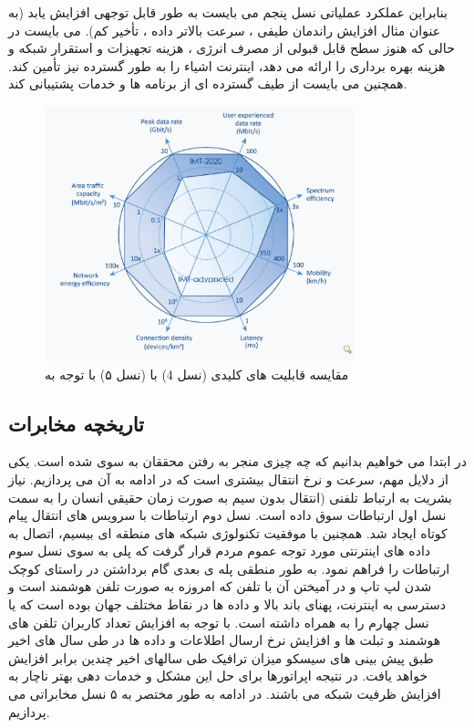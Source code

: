 بنابراین عملکرد عملیاتی نسل پنجم می بایست به طور قابل توجهی افزایش یابد (به عنوان مثال افزایش راندمان طیفی ، سرعت بالاتر داده ، تأخیر کم).
می بایست
در حالی که هنوز سطح قابل قبولی از مصرف انرژی ، هزینه تجهیزات و استقرار شبکه و هزینه بهره برداری را ارائه می دهد،
 اینترنت اشیاء را به طور گسترده نیز تأمین کند.
 همچنین می بایست 
از طیف گسترده ای از برنامه ها و خدمات پشتیبانی کند.
 \begin{figure}[H]
  \centering
    \includegraphics[width=0.8\textwidth]{./fig/etsi}
  \caption{مقایسه قابلیت های کلیدی
 (نسل 4) با
 (نسل ۵) 
 با توجه به
\cite{etsi}
  }
  \label{fig:C-RAN}
\end{figure}
\subsection{تاریخچه مخابرات}
در ابتدا می خواهیم بدانیم که چه چیزی منجر به رفتن محققان به سوی   شده است. یکی از دلایل مهم، سرعت و نرخ انتقال بیشتری است که در ادامه به آن می پردازیم.
نیاز بشریت به ارتباط تلفنی (انتقال بدون سیم به صورت زمان حقیقی  انسان را به سمت نسل اول ارتباطات  سوق داده است. نسل دوم ارتباطات  با سرویس های انتقال پیام کوتاه ایجاد شد. همچنین با موفقیت تکنولوژی شبکه های منطقه ای بیسیم، اتصال به داده های اینترنتی مورد توجه عموم مردم قرار گرفت که پلی به سوی نسل سوم ارتباطات  را فراهم نمود. به طور منطقی پله ی بعدی گام برداشتن در راستای کوچک شدن لپ تاپ و در آمیختن آن با تلفن که امروزه به صورت تلفن هوشمند است و دسترسی به  اینترنت، پهنای باند بالا و داده ها در نقاط مختلف جهان بوده است که  یا نسل چهارم را به همراه داشته است.
با توجه به افزایش تعداد کاربران تلفن های
هوشمند و تبلت ها و افزایش نرخ ارسال اطلاعات و داده ها در طی سال
های اخیر طبق پیش بینی های سیسکو میزان ترافیک  طی سالهای اخیر
  چندین برابر افزایش خواهد یافت.
در نتیجه اپراتورها برای حل این مشکل و خدمات
دهی بهتر ناچار به افزایش ظرفیت شبکه می باشند.
در ادامه به طور مختصر به ۵ نسل مخابراتی می پردازیم\cite{Gen}.
